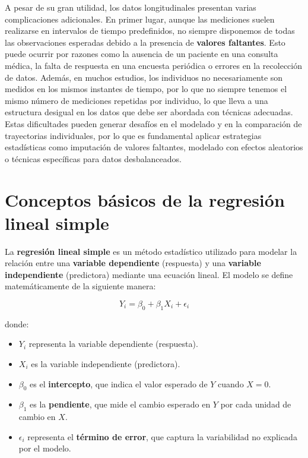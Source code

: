 \documentclass[
  letterpaper,
  DIV=11,
  numbers=noendperiod]{scrreprt}
\providecommand{\tightlist}{%
  \setlength{\itemsep}{0pt}\setlength{\parskip}{0pt}}\usepackage{longtable,booktabs,array}
\begin{document}
A pesar de su gran utilidad, los datos longitudinales presentan varias
complicaciones adicionales. En primer lugar, aunque las mediciones
suelen realizarse en intervalos de tiempo predefinidos, no siempre
disponemos de todas las observaciones esperadas debido a la presencia de
\textbf{valores faltantes}. Esto puede ocurrir por razones como la
ausencia de un paciente en una consulta médica, la falta de respuesta en
una encuesta periódica o errores en la recolección de datos. Además, en
muchos estudios, los individuos no necesariamente son medidos en los
mismos instantes de tiempo, por lo que no siempre tenemos el mismo
número de mediciones repetidas por individuo, lo que lleva a una
estructura desigual en los datos que debe ser abordada con técnicas
adecuadas. Estas dificultades pueden generar desafíos en el modelado y
en la comparación de trayectorias individuales, por lo que es
fundamental aplicar estrategias estadísticas como imputación de valores
faltantes, modelado con efectos aleatorios o técnicas específicas para
datos desbalanceados.

\section{Conceptos básicos de la regresión lineal
simple}\label{conceptos-buxe1sicos-de-la-regresiuxf3n-lineal-simple}

La \textbf{regresión lineal simple} es un método estadístico utilizado
para modelar la relación entre una \textbf{variable dependiente}
(respuesta) y una \textbf{variable independiente} (predictora) mediante
una ecuación lineal. El modelo se define matemáticamente de la siguiente
manera:

\[
Y_i = \beta_0 + \beta_1 X_i + \epsilon_i
\]

donde:

\begin{itemize}
\tightlist
\item
  \(Y_i\) representa la variable dependiente (respuesta).
\item
  \(X_i\) es la variable independiente (predictora).
\item
  \(\beta_0\) es el \textbf{intercepto}, que indica el valor esperado de
  \(Y\) cuando \(X = 0\).
\item
  \(\beta_1\) es la \textbf{pendiente}, que mide el cambio esperado en
  \(Y\) por cada unidad de cambio en \(X\).
\item
  \(\epsilon_i\) representa el \textbf{término de error}, que captura la
  variabilidad no explicada por el modelo.
\end{itemize}
\end{document}
